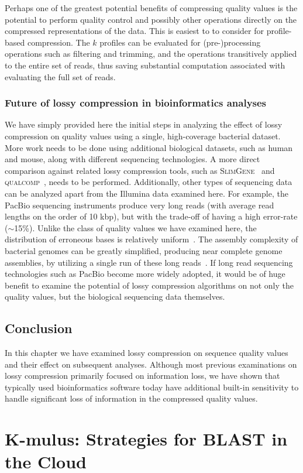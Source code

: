 \documentclass[12pt,\mydriver]{thesis}
\begin{document}
Perhaps one of the greatest potential benefits of compressing quality
values is the potential to perform quality control and possibly other
operations directly on the compressed representations of the
data. This is easiest to to consider for profile-based
compression. The $k$ profiles can be evaluated for (pre-)processing
operations such as filtering and trimming, and the operations
transitively applied to the entire set of reads, thus saving
substantial computation associated with evaluating the full set of
reads.

\subsubsection{Future of lossy compression in bioinformatics analyses}

We have simply provided here the initial steps in analyzing the effect
of lossy compression on quality values using a single,
high-coverage bacterial dataset. More work needs to be done using
additional biological datasets, such as human and mouse, along with
different sequencing technologies. A more direct comparison against
related lossy compression tools, such as
\textsc{SlimGene}~\cite{Kozanitis:2011kl} and
\textsc{\textsc{q}ual\textsc{c}omp}~\cite{Ochoa:2013rt}, needs to be
performed. Additionally, other types of sequencing data can be
analyzed apart from the Illumina data examined here. For example, the
PacBio sequencing instruments produce very long reads (with average
read lengths on the order of 10 kbp), but with the trade-off of having
a high error-rate ($\sim$15\%). Unlike the class of quality values we
have examined here, the distribution of erroneous bases is relatively
uniform~\cite{Ferrarini:2013vf}. The assembly complexity of bacterial
genomes can be greatly simplified, producing near complete genome
assemblies, by utilizing a single run of these long
reads~\cite{Koren:2013ye}. If long read sequencing technologies such
as PacBio become more widely adopted, it would be of huge benefit to
examine the potential of lossy compression algorithms on not only the
quality values, but the biological sequencing data themselves.



\subsection{Conclusion}

In this chapter we have examined lossy compression on sequence quality
values and their effect on subsequent analyses. Although most previous
examinations on lossy compression primarily focused on information
loss, we have shown that typically used bioinformatics software today
have additional built-in sensitivity to handle significant loss of
information in the compressed quality values.
\clearpage{}
\clearpage{}\section{K-mulus: Strategies for BLAST in the Cloud}
\end{document}
